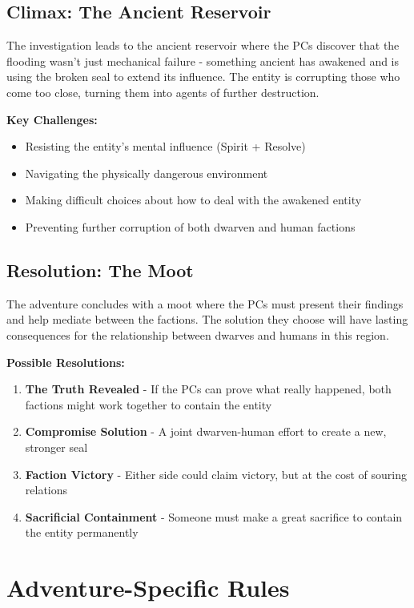 \documentclass[11pt]{article}
\begin{document}
\subsection{Climax: The Ancient Reservoir}

The investigation leads to the ancient reservoir where the PCs discover that the flooding wasn't just mechanical failure - something ancient has awakened and is using the broken seal to extend its influence. The entity is corrupting those who come too close, turning them into agents of further destruction.

\textbf{Key Challenges:}
\begin{itemize}
\item Resisting the entity's mental influence (Spirit + Resolve)
\item Navigating the physically dangerous environment
\item Making difficult choices about how to deal with the awakened entity
\item Preventing further corruption of both dwarven and human factions
\end{itemize}

\subsection{Resolution: The Moot}

The adventure concludes with a moot where the PCs must present their findings and help mediate between the factions. The solution they choose will have lasting consequences for the relationship between dwarves and humans in this region.

\textbf{Possible Resolutions:}
\begin{enumerate}
\item \textbf{The Truth Revealed} - If the PCs can prove what really happened, both factions might work together to contain the entity
\item \textbf{Compromise Solution} - A joint dwarven-human effort to create a new, stronger seal
\item \textbf{Faction Victory} - Either side could claim victory, but at the cost of souring relations
\item \textbf{Sacrificial Containment} - Someone must make a great sacrifice to contain the entity permanently
\end{enumerate}

\section{Adventure-Specific Rules}
\end{document}
